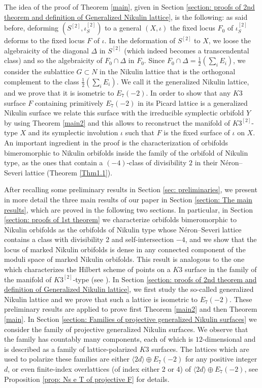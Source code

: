 \documentclass{amsart}
\theoremstyle{definition}
\numberwithin{equation}{section}
\numberwithin{equation}{section} \theoremstyle{definition}
\begin{document}
The idea of the proof of Theorem \ref{main}, given in Section \ref{section: proofs of 2nd theorem and definition of Generalized Nikulin lattice}, is the following:
as said before, deforming $(S^{[2]},\iota_S^{[2]})$ to a general $(X,\iota)$ the fixed locus $F_0$ of $\iota_S^{[2]}$ deforms to the fixed locus $F$ of $\iota$. 
In the deformation of $S^{[2]}$ to $X$, we loose the algebraicity of the diagonal $\Delta$ in $S^{[2]}$ (which indeed becomes a transcendental class) and so the algebraicity of $F_0\cap \Delta$ in $F_0$. Since $F_0\cap \Delta=\frac{1}{2}(\sum_i E_i)$, we consider the sublattice $G\subset N$ in the Nikulin lattice that is the orthogonal complement to the class $\frac{1}{2}(\sum_i E_i)$. We call it the generalized Nikulin lattice, and we prove that it is isometric to $E_7(-2)$.
In order to show that any $K3$ surface $F$ containing primitively $E_7(-2)$ in its Picard lattice is a generalized Nikulin surface we relate this surface with the irreducible symplectic orbifold $Y$ by using Theorem \ref{main2} and this allows to reconstruct the manifold of $K3^{[2]}$-type $X$ and its symplectic involution $\iota$ such that $F$ is the fixed surface of $\iota$ on $X$. 
An important ingredient in the proof is the characterization of orbifolds bimeromorphic to Nikulin orbifolds inside the family of the orbifold of Nikulin type, as the ones that contain a $(-4)$-class of divisibility $2$ in their N\'eron--Severi lattice (Theorem \ref{Thm1.1}).


After recalling some preliminary results in Section \ref{sec: preliminaries}, we present in more detail the three main results of our paper in Section \ref{section: The main results}, which are proved in the following two sections. In particular, in Section \ref{section: proofs of 1st theorem} we characterize orbifolds bimeromorphic to Nikulin orbifolds as the orbifolds of Nikulin type whose N\'eron--Severi lattice contains a class with divisibility 2 and self-intersection $-4$, and we show that the locus of marked Nikulin orbifolds is dense in any connected component of the moduli space of marked Nikulin orbifolds. This result is analogous to the one which characterizes the Hilbert scheme of points on a $K3$ surface in the family of the manifold of $K3^{[2]}$-type (see \cite[Theorem 1.1]{MarkmanMehrotra}). In Section \ref{section: proofs of 2nd theorem and definition of Generalized Nikulin lattice}, we first study the so-called generalized Nikulin lattice and 
we prove that such a lattice is isometric to $E_7(-2)$. These preliminary results are applied to prove first Theorem \ref{main2} and then Theorem \ref{main}. 
In Section \ref{section: Families of projective generalized Nikulin surfaces} we consider the family of projective generalized Nikulin surfaces.  
We observe that the family has countably many components, each of which is $12$-dimensional and is described as a family of lattice-polarized $K3$ surfaces. The lattices which are used to polarize these families are either $\langle 2d\rangle\oplus E_7(-2)$ for any positive integer $d$, or even finite-index overlattices (of index either 2 or 4) of $\langle 2d\rangle\oplus E_7(-2)$, see Proposition \ref{prop: Ns e T of projective F} for details.
\end{document}
